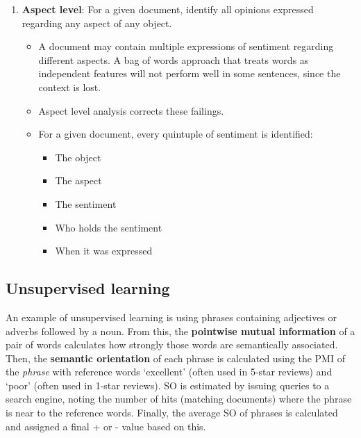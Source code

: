 \documentclass[11pt,a4paper,titlepage,dvipsnames,cmyk]{scrartcl}
\begin{document}
\begin{enumerate}
\item \textbf{Aspect level}: For a given document, identify all opinions expressed regarding any aspect of any object.
\begin{itemize}
    \item A document may contain multiple expressions of sentiment regarding different aspects. A bag of words approach that treats words as independent features will not perform well in some sentences, since the context is lost.
    \item Aspect level analysis corrects these failings.
    \item For a given document, every quintuple of sentiment is identified:
    \begin{itemize}
        \item The object
        \item The aspect
        \item The sentiment
        \item Who holds the sentiment
        \item When it was expressed
    \end{itemize}
\end{itemize}
\end{enumerate}

\subsection{Unsupervised learning}
An example of unsupervised learning is using phrases containing adjectives or adverbs followed by a noun. From this, the \textbf{pointwise mutual information} of a pair of words calculates how strongly those words are semantically associated. Then, the \textbf{semantic orientation} of each phrase is calculated using the PMI of the \textit{phrase} with reference words `excellent' (often used in 5-star reviews) and `poor' (often used in 1-star reviews). SO is estimated by issuing queries to a search engine, noting the number of hits (matching documents) where the phrase is near to the reference words. Finally, the average SO of phrases is calculated and assigned a final + or - value based on this.
\end{document}
